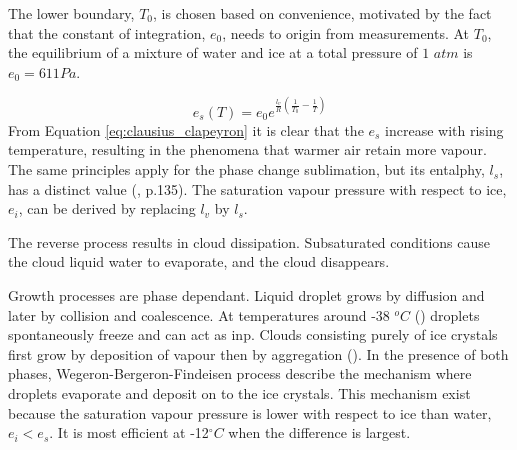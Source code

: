 The lower boundary, $T_0$, is chosen based on convenience, motivated by the fact that the constant of integration,  $e_0$, needs to origin from measurements. At $T_0$, the equilibrium of a mixture of water and ice at a total pressure of $1$ $atm$ is $e_0 = 611Pa$. 

\begin{equation} \label{eq:clausius_clapeyron}
    e_s\left( T \right) = e_0 e^{\frac{l_v}{R} \left( \frac{1}{T_0} - \frac{1}{T} \right) }
\end{equation}
From Equation \eqref{eq:clausius_clapeyron} it is clear that the $e_s$ increase with rising temperature, resulting in the phenomena that warmer air retain more vapour. The same principles apply for the phase change sublimation, but its entalphy, $l_s$, has a distinct value (\cite{cloud_phys_book_johanne}, p.135). The saturation vapour pressure with respect to ice, $e_i$, can be derived by replacing $l_v$ by $l_s$.

The reverse process results in cloud dissipation. Subsaturated conditions cause the cloud liquid water to evaporate, and the cloud disappears. 

Growth processes are phase dependant. Liquid droplet grows by diffusion and later by collision and coalescence. At temperatures around -38 $^oC$ (\cite{lohmann2016}) droplets spontaneously freeze and can act as \acrshort{inp}. Clouds consisting purely of ice crystals first grow by deposition of vapour then by aggregation (\cite{Fowler1996LiquidAssumptions}). In the presence of both phases, Wegeron-Bergeron-Findeisen process describe the mechanism where droplets evaporate and deposit on to the ice crystals. %
This mechanism exist because the saturation vapour pressure is lower with respect to ice than water, $e_i < e_s$. It is most efficient at -12$^{\circ}C$ when the difference is largest.


